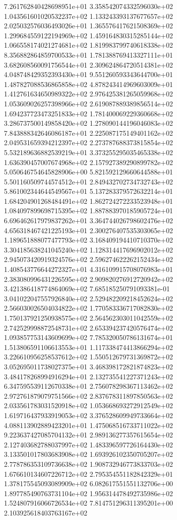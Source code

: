 7.261762840428698951e+01 3.358542074332596030e+02 1.043561601020532237e+02
1.133243393137677657e+02 2.025032576036493026e+01 1.365576417621508369e+02
1.299684559122194969e+02 1.459164830315285144e+02 1.066558174021274681e+02
1.819983799740618338e+02 8.356882864859700533e+01 1.781388769413327111e+01
3.682608560091756544e+01 2.309624864720514381e+02 4.048748429352393430e+01
9.551260593343644700e+01 1.487827088536865858e+02 4.878243414969603009e+01
1.412761634650989322e+02 2.976425381265059968e+02 1.053609026257398966e+02
2.619087889389856514e+02 1.694237723473251833e+02 1.781400069229360668e+02
3.286737500149858420e+02 1.278090144196046083e+02 7.843888342646086187e+01
2.225087175149401162e+02 2.049531659394212397e+02 2.273787688373815854e+02
5.532189636882539219e+01 3.373255295035465338e+02 1.636390457007674968e+02
2.157927389290899782e+02 5.050646754645828906e+00 5.821592129660644588e+01
5.501160509744574512e+01 2.849432702734732743e+02 5.861002344644549567e+01
5.137283379572632214e+01 1.684204901268484491e+02 1.862724272233523948e+01
1.084097899698715395e+02 1.887883970185905724e+01 6.696462617979837262e+01
3.364744026798602476e+02 4.656318467421225193e+01 2.300276407535303065e+02
1.189651888077477793e+02 3.168409194410710370e+02 3.304185638241045240e+02
1.128314417696902012e+02 2.945073420919324576e+02 2.596274622262152434e+02
1.408543776644272327e+01 4.316109915708076983e+01 2.383080996431226595e+02
2.909820276912720942e+02 3.421386418774864069e+02 7.685185250791093381e-01
3.041022047557926840e+02 2.529482209218452624e+02 2.566030026504034822e+02
1.770583336717082830e+02 1.750137921250938575e+02 2.564562303011042559e+02
2.742529998872548731e+02 2.653394237420576474e+02 1.093857753143609699e+02
7.785320050786131674e+01 1.513806591106613553e+01 1.117338474413866294e+02
3.226610956258537612e+02 1.550512679731369872e+02 3.052695011738027375e+01
3.468398172821874823e+02 3.484178268994916294e+01 2.132735541227371243e+02
6.347595539112670338e+01 2.756078298367113462e+02 2.972761879079751566e+02
2.837678311897850563e+02 2.033561783031520918e+02 1.053668693272912549e+02
1.619716437933919053e+02 3.376528609949733664e+02 4.088113902889423201e+01
1.475068516733711022e+02 9.223637427085704132e+01 2.989136277357615654e+02
2.127403682788037997e+02 1.483396597726164430e+02 3.133501017803683908e+02
1.693926102350705207e+02 2.778786353109736638e+02 1.908732946773833703e+02
1.676610134607226712e+02 2.795354551182842329e+01 1.378175545093089909e+02
6.082617551551132706e+00 1.897785490763731104e+02 1.956314478492735986e+02
1.524807916066726534e+02 7.814751296311395201e+00 2.103925618403763167e+02
